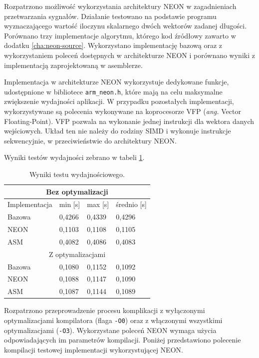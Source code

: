 Rozpatrzono możliwość wykorzystania architektury NEON w zagadnieniach przetwarzania sygnałów. 
Działanie testowano na podstawie programu wyznaczającego wartość iloczynu skalarnego dwóch wektorów zadanej długości. 
Porównano trzy implementacje algorytmu, którego kod źródłowy zawarto w dodatku \ref{cha:neon-source}.
Wykorzystano implementację bazową oraz z wykorzystaniem poleceń dostępnych w architekturze NEON i porównano wyniki z implementacją zaprojektowaną w asemblerze. %

Implementacja w architekturze NEON wykorzystuje dedykowane funkcje, udostępnione w bibliotece \texttt{arm\_neon.h}, które mają na celu maksymalne zwiększenie wydajności aplikacji. 
W przypadku pozostałych implementacji, wykorzystywane są polecenia wykonywane na koprocesorze VFP (\emph{ang.} Vector Floating-Point). 
VFP pozwala na wykonanie jednej instrukcji dla wektora danych wejściowych. 
Układ ten nie należy do rodziny SIMD i wykonuje instrukcje sekwencyjnie, w przeciwieństwie do architektury NEON.


Wyniki testów wydajności zebrano w tabeli \ref{tab:neon-time-results}. %

\begin{table}[h]
	\caption{Wyniki testu wydajnościowego.}
	\centering
	\label{tab:neon-time-results}
	\begin{tabular}{|l|l|l|l|}
		\hline
		\multicolumn{4}{|c|}{Bez optymalizacji} \\ \hline
		Implementacja & min {[}s{]} & max {[}s{]} & średnio {[}s{]} \\ \hline
		Bazowa & 0,4266 & 0,4339 & 0,4296 \\ \hline
		NEON & 0,1103 & 0,1108 & 0,1105 \\ \hline
		ASM & 0,4082 & 0,4086 & 0,4083 \\ \hline
		\multicolumn{4}{|c|}{Z optymalizacjami} \\ \hline
		Bazowa & 0,1080 & 0,1152 & 0,1092 \\ \hline
		NEON & 0,1088 & 0,1147 & 0,1090 \\ \hline
		ASM & 0,1087 & 0,1144 & 0,1089 \\ \hline
	\end{tabular}
\end{table}

Rozpatrzono przeprowadzenie procesu komplikacji z wyłączonymi optymalizacjami kompilatora (flaga \texttt{-O0}) oraz z włączonymi wszystkimi optymalizacjami (\texttt{-O3}).
Wykorzystane poleceń NEON wymaga użycia odpowiadających im parametrów kompilacji. 
Poniżej przedstawiono polecenie kompilacji testowej implementacji wykorzystującej NEON.

